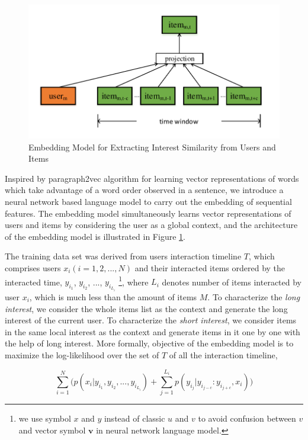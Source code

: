 \documentclass{llncs}
\begin{document}
\begin{figure}[htbp]
	\centering
	\includegraphics[scale=0.45]{images/doc2vec.pdf}
	\caption{Embedding Model for Extracting Interest Similarity from Users and Items}
	\label{fig:doc2vec}
\end{figure}

Inspired by paragraph2vec algorithm \cite{le2014distributed} for learning
vector representations of words which take advantage of a word order observed in a sentence,
we introduce a neural network based language model to carry out the embedding of sequential features.
The embedding model simultaneously learns vector representations of users and items
by considering the user as a global context,
and the architecture of the embedding model is illustrated in Figure \ref{fig:doc2vec}.

The training data set was derived from users interaction timeline $T$,
which comprises users $x_i (i=1,2,...,N)$ and their interacted items ordered by the interacted time,
$y_{i_1}$, $y_{i_2}$, ..., $y_{i_{L_i}}$
\footnote{we use symbol $x$ and $y$ instead of classic $u$ and $v$ to avoid confusion between $v$
	and vector symbol $\mathbf{v}$ in neural network language model.},
where $L_i$ denotes number of items interacted by user $x_i$,
which is much less than the amount of items $M$.
To characterize the \emph{long interest}, we consider the whole items list as the context and generate
the long interest of the current user.
To characterize the \emph{short interest}, we consider items in the same local interest as the context
and generate items in it one by one with the help of long interest.
More formally, objective of the embedding model is to
maximize the log-likelihood over the set of $T$ of all the interaction timeline,

\begin{equation}
\sum_{i=1}^{N} \bigg( p(x_i | y_{i_1}, y_{i_2}, ..., y_{i_{L_i}}) +
\sum_{j=1}^{L_i} p(y_{i_j} | y_{i_{j-c}} : y_{i_{j+c}}, x_i) \bigg)
\end{equation}
\end{document}
